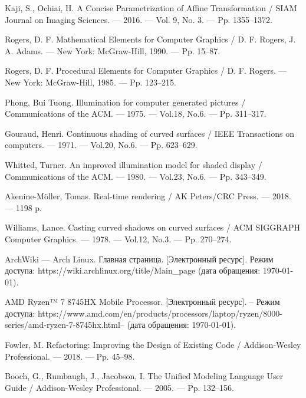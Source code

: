 \begin{thebibliography}{}
	\vspace{-1\baselineskip}

 Kaji, S., Ochiai, H. A Concise Parametrization of Affine Transformation / SIAM Journal on Imaging Sciences. --- 2016. --- Vol. 9, No. 3. --- Pp. 1355--1372.

 Rogers, D. F. Mathematical Elements for Computer Graphics / D. F. Rogers, J. A. Adams. --- New York: McGraw-Hill, 1990. --- Pp. 15--87.

 Rogers, D. F. Procedural Elements for Computer Graphics / D. F. Rogers. --- New York: McGraw-Hill, 1985. --- Pp. 123--215.

 Phong, Bui Tuong. Illumination for computer generated pictures / Communications of the ACM. --- 1975. --- Vol.18, No.6. --- Pp. 311--317.

 Gouraud, Henri. Continuous shading of curved surfaces / IEEE Transactions on computers. --- 1971. --- Vol.20, No.6. --- Pp. 623--629.

 Whitted, Turner. An improved illumination model for shaded display / Communications of the ACM. --- 1980. --- Vol.23, No.6. --- Pp. 343--349.

 Akenine-Möller, Tomas. Real-time rendering / AK Peters/CRC Press. --- 2018. --- 1198 p.

 Williams, Lance. Casting curved shadows on curved surfaces / ACM SIGGRAPH Computer Graphics. --- 1978. --- Vol.12, No.3. --- Pp. 270--274.

 ArchWiki --- Arch Linux. Главная страница. [Электронный ресурс]. Режим доступа: https://wiki.archlinux.org/title/Main\_page (дата обращения: \today).
	
 AMD Ryzen™ 7 8745HX Mobile Processor. [Электронный ресурс]. -- Режим доступа: https://www.amd.com/en/products/processors/laptop/ryzen/8000-series/amd-ryzen-7-8745hx.html-- (дата обращения: \today).

 Fowler, M. Refactoring: Improving the Design of Existing Code / Addison-Wesley Professional. --- 2018. --- Pp. 45--98.

 Booch, G., Rumbaugh, J., Jacobson, I. The Unified Modeling Language User Guide / Addison-Wesley Professional. --- 2005. --- Pp. 132--156.


\end{thebibliography}
